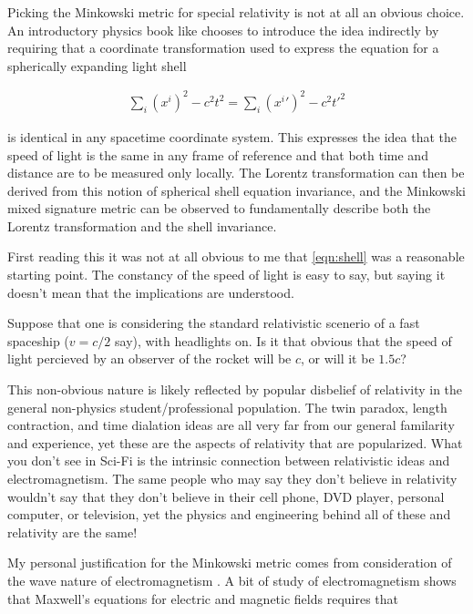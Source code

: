 \documentclass{article}      %
\begin{document}
Picking the
Minkowski metric for special relativity is not at all an obvious 
choice.  An introductory physics book like \cite{lewis1965mbp} chooses
to introduce the idea indirectly by requiring that a coordinate transformation
used to express the equation for a spherically expanding light shell

\begin{align}\label{eqn:shell}
\sum_i (x^i)^2 - c^2 t^2 = \sum_i ({x^i}')^2 - c^2 {t'}^2
\end{align}

is identical in any spacetime coordinate system.  This expresses the idea that the speed
of light is the same in any frame of reference and that both time and distance
are to be measured only locally.  The Lorentz transformation can then be derived from
this notion of spherical shell equation invariance, and the Minkowski mixed signature
metric can be observed to fundamentally describe both the Lorentz transformation and the
shell invariance.

First reading this it was not at all obvious to me that \ref{eqn:shell} was a reasonable starting
point.  The constancy of the speed of light is easy to say, but saying it doesn't mean
that the implications are understood.

Suppose that one is considering the standard relativistic scenerio of a fast spaceship ($v = c/2$ say),
with headlights on.  Is it that obvious that the speed of light percieved by an observer of the rocket
will be $c$, or will it be $1.5 c$?

This non-obvious nature is likely reflected by popular disbelief of relativity in the general non-physics student/professional population.
The twin paradox, length contraction, and time dialation ideas are all very far from our general
familarity and experience, yet these are the aspects of relativity that are popularized.
What you don't see in Sci-Fi is the intrinsic connection between relativistic
ideas and electromagnetism.  The same people who may say they don't believe in relativity wouldn't say that they don't believe in their cell phone,
DVD player, personal computer, or television, yet the physics and engineering behind all of these and relativity are the same!

My personal justification for the Minkowski metric comes from consideration of the wave
nature of electromagnetism \cite{PJLorentzWave}.  A bit of study of electromagnetism shows that Maxwell's equations
for electric and magnetic fields requires that
\end{document}
